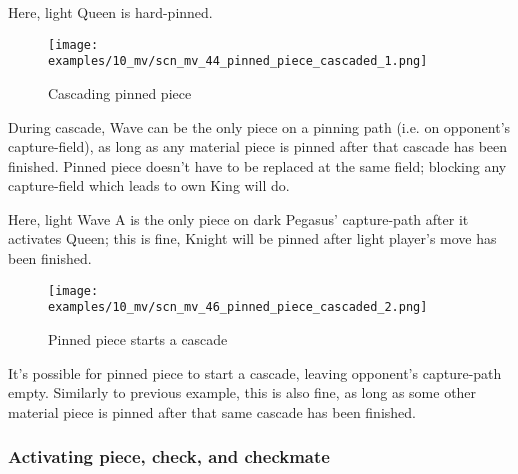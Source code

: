Here, light Queen is hard-pinned.

\clearpage %

\vspace*{-2.1\baselineskip}
\noindent
\begin{figure}[!h]
\texttt{[image: examples/10\_mv/scn\_mv\_44\_pinned\_piece\_cascaded\_1.png]}
\vspace*{-1.3\baselineskip}
\caption{Cascading pinned piece}
\label{fig:scn_mv_44_pinned_piece_cascaded_1}
\end{figure}

\vspace*{-0.5\baselineskip}
During cascade, Wave can be the only piece on a pinning path (i.e. on opponent's
capture-field), as long as any material piece is pinned after that cascade has been
finished. Pinned piece doesn't have to be replaced at the same field; blocking any
capture-field which leads to own King will do.

Here, light Wave A is the only piece on dark Pegasus' capture-path after it activates
Queen; this is fine, Knight will be pinned after light player's move has been finished.

\clearpage %

\vspace*{-2.3\baselineskip}
\noindent
\begin{figure}[!h]
\texttt{[image: examples/10\_mv/scn\_mv\_46\_pinned\_piece\_cascaded\_2.png]}
\caption{Pinned piece starts a cascade}
\label{fig:scn_mv_46_pinned_piece_cascaded_2}
\end{figure}

It's possible for pinned piece to start a cascade, leaving opponent's capture-path
empty. Similarly to previous example, this is also fine, as long as some other
material piece is pinned after that same cascade has been finished.

\clearpage %

\subsubsection*{Activating piece, check, and checkmate}
\label{sec:Miranda's veil/Wave/Cascading Waves/Activating piece, check, and checkmate}

